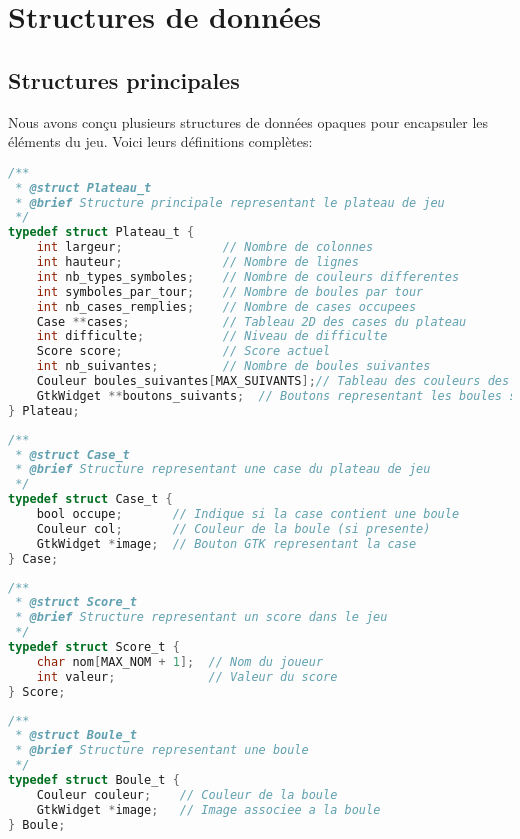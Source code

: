 
\section{Structures de données}\label{structures}

\subsection{Structures principales}

Nous avons conçu plusieurs structures de données opaques pour encapsuler les éléments du jeu. Voici leurs définitions complètes:

\begin{lstlisting}[language=C, caption=Structure Plateau\_t]
/**
 * @struct Plateau_t
 * @brief Structure principale representant le plateau de jeu
 */
typedef struct Plateau_t {
    int largeur;              // Nombre de colonnes
    int hauteur;              // Nombre de lignes
    int nb_types_symboles;    // Nombre de couleurs differentes
    int symboles_par_tour;    // Nombre de boules par tour
    int nb_cases_remplies;    // Nombre de cases occupees
    Case **cases;             // Tableau 2D des cases du plateau
    int difficulte;           // Niveau de difficulte
    Score score;              // Score actuel
    int nb_suivantes;         // Nombre de boules suivantes
    Couleur boules_suivantes[MAX_SUIVANTS];// Tableau des couleurs des boules suivantes
    GtkWidget **boutons_suivants;  // Boutons representant les boules suivantes
} Plateau;
\end{lstlisting}

\begin{lstlisting}[language=C, caption=Structure Case\_t]
/**
 * @struct Case_t
 * @brief Structure representant une case du plateau de jeu
 */
typedef struct Case_t {
    bool occupe;       // Indique si la case contient une boule
    Couleur col;       // Couleur de la boule (si presente)
    GtkWidget *image;  // Bouton GTK representant la case
} Case;
\end{lstlisting}

\begin{lstlisting}[language=C, caption=Structure Score\_t]
/**
 * @struct Score_t
 * @brief Structure representant un score dans le jeu
 */
typedef struct Score_t {
    char nom[MAX_NOM + 1];  // Nom du joueur
    int valeur;             // Valeur du score
} Score;
\end{lstlisting}

\begin{lstlisting}[language=C, caption=Structure Boule\_t]
/**
 * @struct Boule_t
 * @brief Structure representant une boule
 */
typedef struct Boule_t {
    Couleur couleur;    // Couleur de la boule
    GtkWidget *image;   // Image associee a la boule
} Boule;
\end{lstlisting}

